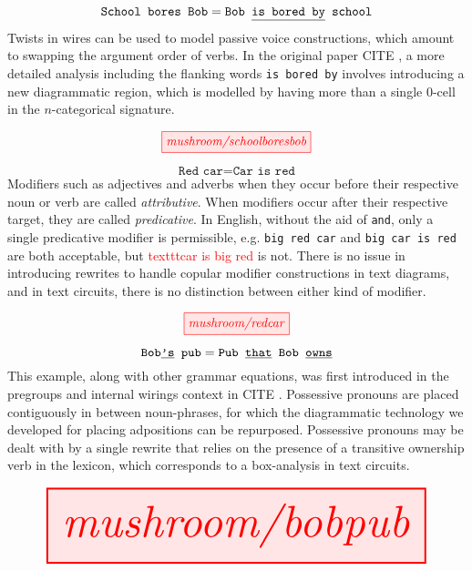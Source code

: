 \begin{myboxB}
\begin{example}\label{ex:pass}
\[\texttt{School bores Bob} = \texttt{Bob \underline{is bored by} school}\]
Twists in wires can be used to model passive voice constructions, which amount to swapping the argument order of verbs. In the original paper \bR CITE \e, a more detailed analysis including the flanking words \texttt{\texttt{is} bored \texttt{by}} involves introducing a new diagrammatic region, which is modelled by having more than a single 0-cell in the $n$-categorical signature.
\end{example}
\[\tikzfig{mushroom/schoolboresbob}\]
\end{myboxB}

\begin{myboxB}
\begin{example}\label{ex:copula}
\[\texttt{Red car} = \texttt{Car is red}\]
Modifiers such as adjectives and adverbs when they occur before their respective noun or verb are called \emph{attributive}. When modifiers occur after their respective target, they are called \emph{predicative}. In English, without the aid of \texttt{and}, only a single predicative modifier is permissible, e.g. \texttt{big red car} and \texttt{big car is red} are both acceptable, but \textcolor{red}{texttt{car is big red}} is not. There is no issue in introducing rewrites to handle copular modifier constructions in text diagrams, and in text circuits, there is no distinction between either kind of modifier.
\end{example}
\[\tikzfig{mushroom/redcar}\]
\end{myboxB}

\begin{myboxB}
\begin{example}\label{ex:posspron}
\[\texttt{Bob\underline{'s} pub} = \texttt{Pub \underline{that} Bob \underline{owns}}\]
This example, along with other grammar equations, was first introduced in the pregroups and internal wirings context in \bR CITE \e. Possessive pronouns are placed contiguously in between noun-phrases, for which the diagrammatic technology we developed for placing adpositions can be repurposed. Possessive pronouns may be dealt with by a single rewrite that relies on the presence of a transitive ownership verb in the lexicon, which corresponds to a box-analysis in text circuits.
\end{example}
\[\resizebox{\textwidth}{!}{\tikzfig{mushroom/bobpub}}\]
\end{myboxB}

